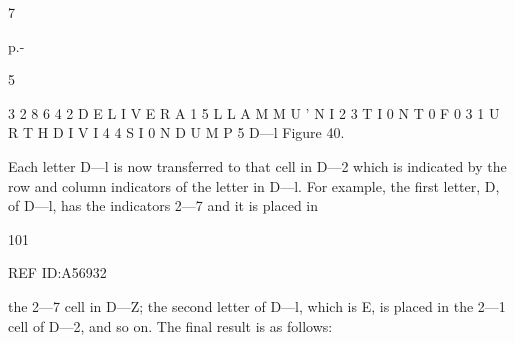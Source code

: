 {7

p.-

5

 

 

 

 

 

 

 

 

 

 

 

 

 

 

 

 

3 2 8 6 4
2 D E L I V E R A 1
5 L L A M M U ' N I 2
3 T I 0 N T 0 F 0 3
1 U R T H D I V I 4
4 S I 0 N D U M P 5
D—l
Figure 40.

Each letter D—l is now transferred to that cell in D—2 which is indicated
by the row and column indicators of the letter in D—l. For example,
the ﬁrst letter, D, of D—l, has the indicators 2—7 and it is placed in

101

 

REF ID:A56932

the 2—7 cell in D—Z; the second letter of D—l, which is E, is placed
in the 2—1 cell of D—2, and so on. The ﬁnal result is as follows:

 

 

 

 

 

 

 

 

 

 

 

 

 

 

 

 

 

 

 

 

 

 

 

 

 

}

